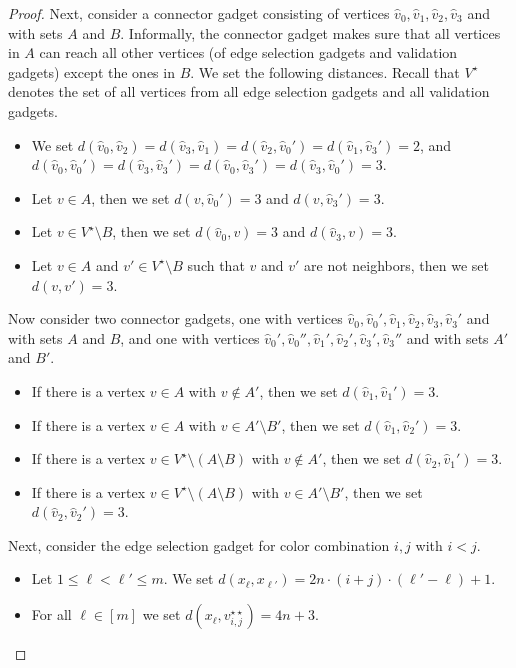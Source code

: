 \documentclass[11pt,a4paper]{article}
\theoremstyle{remark}
\theoremstyle{definition}
\begin{document}
\begin{proof}
Next, consider a connector gadget consisting of vertices $\hat{v}_0,\hat{v}_1,\hat{v}_2,\hat{v}_3$ and with sets $A$ and $B$. Informally, the connector gadget makes sure that all vertices in $A$ can reach all other vertices (of edge selection gadgets and validation gadgets) except the ones in $B$. We set the following distances. Recall that $V^\star$ denotes the set of all vertices from all edge selection gadgets and all validation gadgets.
\begin{itemize}
    \item We set $d(\hat{v}_0,\hat{v}_2)=d(\hat{v}_3,\hat{v}_1)=d(\hat{v}_2,\hat{v}_0')=d(\hat{v}_1,\hat{v}_3')=2$, and $d(\hat{v}_0,\hat{v}_0')=d(\hat{v}_3,\hat{v}_3')=d(\hat{v}_0,\hat{v}_3')=d(\hat{v}_3,\hat{v}_0')=3$.
    \item Let $v\in A$, then we set $d(v,\hat{v}_0')=3$ and $d(v,\hat{v}_3')=3$.
    \item Let $v\in V^\star\setminus B$, then we set $d(\hat{v}_0,v)=3$ and $d(\hat{v}_3,v)=3$.
    \item Let $v\in A$ and $v'\in V^\star\setminus B$ such that $v$ and $v'$ are not neighbors, then we set $d(v,v')=3$.
\end{itemize}
Now consider two connector gadgets, one with vertices $\hat{v}_0,\hat{v}_0',\hat{v}_1,\hat{v}_2,\hat{v}_3,\hat{v}_3'$ and with sets $A$ and $B$, and one with vertices $\hat{v}_0',\hat{v}_0'',\hat{v}_1',\hat{v}_2',\hat{v}_3',\hat{v}_3''$ and with sets $A'$ and $B'$.
\begin{itemize}
    \item If there is a vertex $v\in A$ with $v\notin A'$, then we set $d(\hat{v}_1,\hat{v}_1')=3$.
    \item If there is a vertex $v\in A$ with $v\in A'\setminus B'$, then we set $d(\hat{v}_1,\hat{v}_2')=3$.
    \item If there is a vertex $v\in V^\star\setminus (A\setminus B)$ with $v\notin A'$, then we set $d(\hat{v}_2,\hat{v}_1')=3$.    
    \item If there is a vertex $v\in V^\star\setminus (A\setminus B)$ with $v\in A'\setminus B'$, then we set $d(\hat{v}_2,\hat{v}_2')=3$.
\end{itemize}

Next, consider the edge selection gadget for color combination $i,j$ with $i<j$.
\begin{itemize}
    \item Let $1\le \ell<\ell'\le m$. We set $d(x_\ell,x_{\ell'})=2n\cdot (i+j)\cdot(\ell'-\ell)+1$.
    \item For all $\ell\in[m]$ we set $d(x_\ell,v_{i,j}^{\star\star})=4n+3$.
\end{itemize}


\end{proof}
\end{document}
